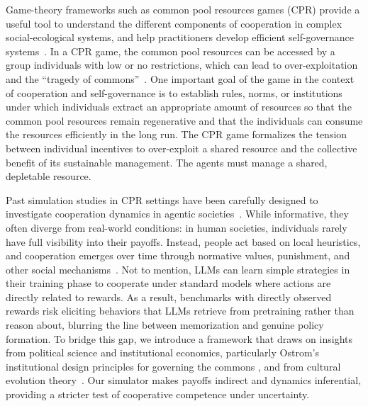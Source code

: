 \documentclass[sigconf]{aamas}
\begin{document}
Game-theory frameworks such as common pool resources games (CPR) provide a useful tool to understand the different components of cooperation in complex social-ecological systems, and help practitioners develop efficient self-governance systems~\cite{ostrom1990governing}.
In a CPR game, the common pool resources can be accessed by a group individuals with low or no restrictions, which can lead to over-exploitation and the ``tragedy of commons''~\cite{hardin1968tragedy}.
One important goal of the game in the context of cooperation and self-governance is to establish rules, norms, or institutions under which individuals extract an appropriate amount of resources so that the common pool resources remain regenerative and that the individuals can consume the resources efficiently in the long run. 
The CPR game formalizes the tension between individual incentives to over-exploit a shared resource and the collective benefit of its sustainable management. 
The agents must manage a shared, depletable resource. 

Past simulation studies in CPR settings have been carefully designed to investigate cooperation dynamics in agentic societies~\cite{piatti2024govsim, piedrahita2025corrupted, backmann2025ethics}. 
While informative, they often diverge from real-world conditions: in human societies, individuals rarely have full visibility into their payoffs.
Instead, people act based on local heuristics, and cooperation emerges over time through normative values, punishment, and other social mechanisms~\cite{centola2015spontaneous}. 
Not to mention, LLMs can learn simple strategies in their training phase to cooperate under standard models where actions are directly related to rewards.
As a result, benchmarks with directly observed rewards risk eliciting behaviors that LLMs retrieve from pretraining rather than reason about, blurring the line between memorization and genuine policy formation.
To bridge this gap, we introduce a framework that draws on insights from political science and institutional economics, particularly Ostrom’s institutional design principles for governing the commons \cite{ostrom1990governing,ostrom2009general}, and from cultural evolution theory~\cite{bowles1998moral,boyd2002group,boyd2009voting,henrich2006cooperation}.
Our simulator makes payoffs indirect and dynamics inferential, providing a stricter test of cooperative competence under uncertainty.
\end{document}
